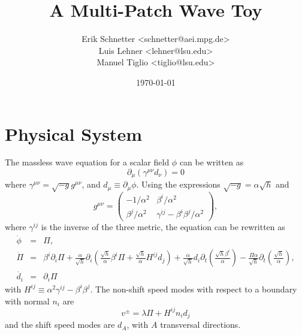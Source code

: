 \documentclass{article}
\begin{document}
\author{Erik Schnetter \textless schnetter@aei.mpg.de\textgreater \\
Luis Lehner \textless lehner@lsu.edu\textgreater \\
Manuel Tiglio \textless tiglio@lsu.edu\textgreater}
\title{A Multi-Patch Wave Toy}

\date{\today}

\maketitle


%


\section{Physical System}

The massless wave equation for a scalar field $\phi$ can be written as
$$
\partial_\mu(\gamma^{\mu \nu}d_\nu)=0
$$
where $\gamma^{\mu \nu}=\sqrt{-g}g^{\mu \nu}$, and $d_{\mu}\equiv\partial_{\mu }\phi$. Using the
expressions $\sqrt{-g} = \alpha\sqrt{h}$ and
\begin{displaymath}
g^{\mu\nu} = \left( \begin{array}{cc} -1/\alpha^2 & \beta^i/\alpha^2
\\ \beta^j/\alpha^2 & \gamma^{ij} - \beta^i \beta^j/\alpha^2 \end{array} \right),
\end{displaymath}
where $\gamma^{ij}$ is the inverse of the three metric, the equation can be rewritten as
\begin{eqnarray}
\dot{\phi } &=& \Pi, \\
\dot{\Pi} &=& \beta^i\partial_i\Pi + 
\frac{\alpha }{\sqrt{h}}\partial_i\left(\frac{\sqrt{h}}{\alpha} \beta^i\Pi + 
\frac{\sqrt{h}}{\alpha}H^{ij}d_j \right) + \frac{\alpha }{\sqrt{h}}d_i\partial_t
\left(\frac{\sqrt{h}\beta ^i}{\alpha } \right) - \frac{\Pi \alpha
}{\sqrt{h}}\partial_t \left( \frac{\sqrt{h}}{\alpha }  \right), \\
\dot{d_i} &=& \partial_i \Pi
\end{eqnarray}
with $H^{ij} \equiv \alpha^2 \gamma^{ij} - \beta^i \beta^j$.
The non-shift speed modes with respect to a boundary with normal $n_i$ are 
$$
v^{\pm} = \lambda \Pi + H^{ij}n_id_j
$$
and the shift speed modes are $d_A$, with $A$ transversal directions. 
\end{document}
